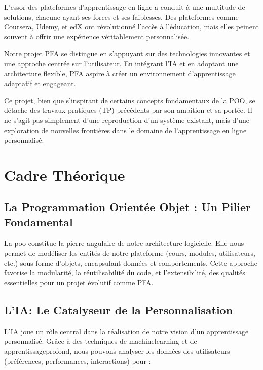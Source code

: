 \vfill \dotfill

\begin{displayquote}
L'essor des plateformes d'apprentissage en ligne a conduit à une multitude de solutions, chacune ayant ses forces et ses faiblesses. Des plateformes comme Coursera, Udemy, et edX ont révolutionné l'accès à l'éducation, mais elles peinent souvent à offrir une expérience véritablement personnalisée.

Notre projet PFA se distingue en s'appuyant sur des technologies innovantes et une approche centrée sur l'utilisateur. En intégrant l'IA et en adoptant une architecture flexible, PFA aspire à créer un environnement d'apprentissage adaptatif et engageant.

Ce projet, bien que s'inspirant de certains concepts fondamentaux de la POO, se détache des travaux pratiques (TP) précédents par son ambition et sa portée. Il ne s'agit pas simplement d'une reproduction d'un système existant, mais d'une exploration de nouvelles frontières dans le domaine de l'apprentissage en ligne personnalisé.
\end{displayquote}

\section{Cadre Théorique}

\subsection{La Programmation Orientée Objet : Un Pilier Fondamental}

La \gls{poo} constitue la pierre angulaire de notre architecture logicielle. Elle nous permet de modéliser les entités de notre plateforme (cours, modules, utilisateurs, etc.) sous forme d'objets, encapsulant données et comportements. Cette approche favorise la modularité, la réutilisabilité du code, et l'extensibilité, des qualités essentielles pour un projet évolutif comme PFA.

\subsection{L'IA: Le Catalyseur de la Personnalisation}

L'\gls{IA} joue un rôle central dans la réalisation de notre vision d'un apprentissage personnalisé. Grâce à des techniques de \gls{machinelearning} et de \gls{apprentissageprofond}, nous pouvons analyser les données des utilisateurs (préférences, performances, interactions) pour :

